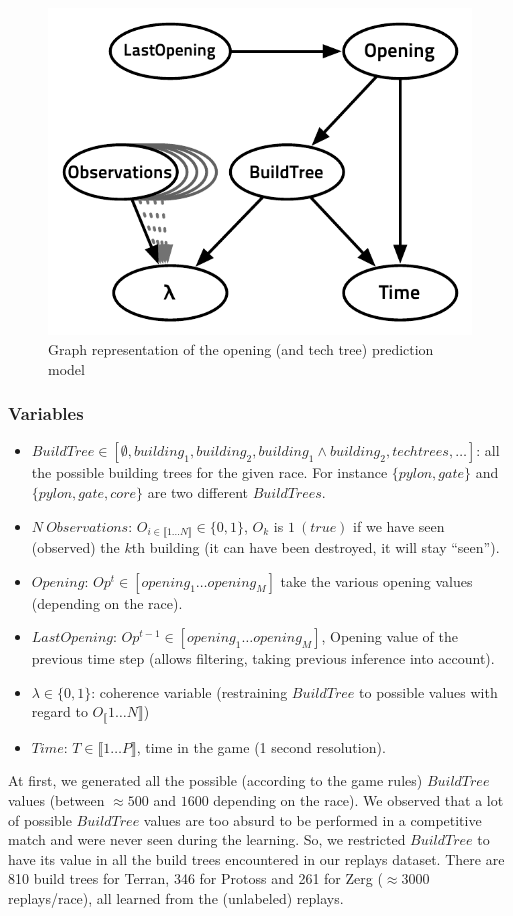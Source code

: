 \begin{figure}[htp]
\centerline{\includegraphics[width=0.4\columnwidth]{images/OpeningPrediction2.pdf}}
\caption{Graph representation of the opening (and tech tree) prediction model}
\label{BNPrediction}
\end{figure}

\subsubsection{Variables}
\begin{itemize}
\item $BuildTree \in [\emptyset, building_1, building_2, building_1\wedge building_2, techtrees, \dots]$: all the possible building trees for the given race. For instance $\{pylon, gate\}$ and $\{pylon, gate, core\}$ are two different $BuildTrees$.
\item $N\ Observations$: $O_{i \in \llbracket 1\dots N \rrbracket} \in \{0, 1\}$, $O_k$ is $1\ (true)$ if we have seen (observed) the $k$th building (it can have been destroyed, it will stay ``seen'').
\item $Opening$: $Op^t \in [opening_1 \dots opening_M]$ take the various opening values (depending on the race).
\item $LastOpening$: $Op^{t-1} \in [opening_1 \dots opening_M]$, Opening value of the previous time step (allows filtering, taking previous inference into account).
\item $\lambda \in \{0, 1\}$: coherence variable (restraining $BuildTree$ to possible values with regard to $O_\llbracket 1 \dots N \rrbracket$)
\item $Time$: $T \in \llbracket 1\dots P \rrbracket$, time in the game (1 second resolution).
\end{itemize}

At first, we generated all the possible (according to the game rules) $BuildTree$ values (between $\approx 500$ and $1600$ depending on the race). We observed that a lot of possible $BuildTree$ values are too absurd to be performed in a competitive match and were never seen during the learning. So, we restricted $BuildTree$ to have its value in all the build trees encountered in our replays dataset. 
There are 810 build trees for Terran, 346 for Protoss and 261 for Zerg ($\approx 3000$ replays/race), all learned from the (unlabeled) replays.

